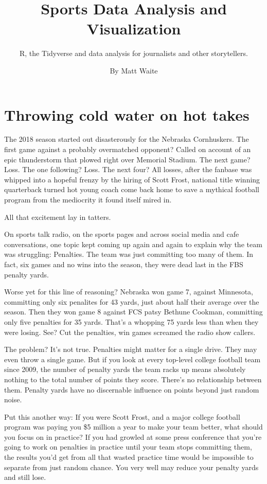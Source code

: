 \documentclass[]{book}
\title{Sports Data Analysis and Visualization}
\subtitle{R, the Tidyverse and data analysis for journalists and other
storytellers.}
\author{By Matt Waite}
\date{}
\begin{document}
\maketitle

{
\setcounter{tocdepth}{1}
\tableofcontents
}
\chapter{Throwing cold water on hot
takes}\label{throwing-cold-water-on-hot-takes}

The 2018 season started out disasterously for the Nebraska Cornhuskers.
The first game against a probably overmatched opponent? Called on
account of an epic thunderstorm that plowed right over Memorial Stadium.
The next game? Loss. The one following? Loss. The next four? All losses,
after the fanbase was whipped into a hopeful frenzy by the hiring of
Scott Frost, national title winning quarterback turned hot young coach
come back home to save a mythical football program from the mediocrity
it found itself mired in.

All that excitement lay in tatters.

On sports talk radio, on the sports pages and across social media and
cafe conversations, one topic kept coming up again and again to explain
why the team was struggling: Penalties. The team was just committing too
many of them. In fact, six games and no wins into the season, they were
dead last in the FBS penalty yards.

Worse yet for this line of reasoning? Nebraska won game 7, against
Minnesota, committing only six penalites for 43 yards, just about half
their average over the season. Then they won game 8 against FCS patsy
Bethune Cookman, committing only five penalties for 35 yards. That's a
whopping 75 yards less than when they were losing. See? Cut the
penalties, win games screamed the radio show callers.

The problem? It's not true. Penalties might matter for a single drive.
They may even throw a single game. But if you look at every top-level
college football team since 2009, the number of penalty yards the team
racks up means absolutely nothing to the total number of points they
score. There's no relationship between them. Penalty yards have no
discernable influence on points beyond just random noise.

Put this another way: If you were Scott Frost, and a major college
football program was paying you \$5 million a year to make your team
better, what should you focus on in practice? If you had growled at some
press conference that you're going to work on penalties in practice
until your team stops committing them, the results you'd get from all
that wasted practice time would be impossible to separate from just
random chance. You very well may reduce your penalty yards and still
lose.
\end{document}
